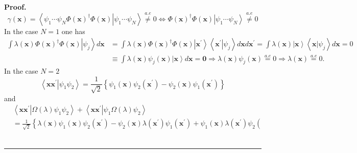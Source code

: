 \documentclass[aps,preprint]{revtex4}%
\newenvironment{proof}[1][Proof]{\noindent\textbf{#1.} }{\ \rule{0.5em}{0.5em}}
\begin{document}
\begin{proof}
\begin{equation}
\gamma\left(  \mathbf{x}\right)  =\left\langle \psi_{1}\cdots\psi_{N}\left.
\Phi\left(  \mathbf{x}\right)  ^{\dagger}\Phi\left(  \mathbf{x}\right)
\right\vert \psi_{1}\cdots\psi_{N}\right\rangle \overset{a.e}{\neq
}0\Longleftrightarrow\Phi\left(  \mathbf{x}\right)  ^{\dagger}\Phi\left(
\mathbf{x}\right)  \left\vert \psi_{1}\cdots\psi_{N}\right\rangle
\overset{a.e}{\neq}0
\end{equation}
In the case $N=1$ one has%
\begin{align}
\int\lambda\left(  \mathbf{x}\right)  \Phi\left(  \mathbf{x}\right)
^{\dagger}\Phi\left(  \mathbf{x}\right)  \left\vert \psi_{j}\right\rangle
d\mathbf{x}  &  =\int\lambda\left(  \mathbf{x}\right)  \Phi\left(
\mathbf{x}\right)  ^{\dagger}\Phi\left(  \mathbf{x}\right)  \left\vert
\mathbf{x}^{\prime}\right\rangle \left\langle \left.  \mathbf{x}^{\prime
}\right\vert \psi_{j}\right\rangle d\mathbf{x}d\mathbf{x}^{\prime}=\int
\lambda\left(  \mathbf{x}\right)  \left\vert \mathbf{x}\right\rangle
\left\langle \left.  \mathbf{x}\right\vert \psi_{j}\right\rangle
d\mathbf{x}=0\nonumber\\
&  \equiv\int\lambda\left(  \mathbf{x}\right)  \psi_{j}\left(  \mathbf{x}%
\right)  \left\vert \mathbf{x}\right\rangle d\mathbf{x=0\Rightarrow}%
\lambda\left(  \mathbf{x}\right)  \psi_{j}\left(  \mathbf{x}\right)
\overset{a.e}{=}0\Rightarrow\lambda\left(  \mathbf{x}\right)  \overset{a.e}%
{=}0.
\end{align}
In the case $N=2$
\begin{equation}
\left\langle \left.  \mathbf{xx}^{\prime}\right\vert \psi_{1}\psi
_{2}\right\rangle =\frac{1}{\sqrt{2}}\left\{  \psi_{1}\left(  \mathbf{x}%
\right)  \psi_{2}\left(  \mathbf{x}^{\prime}\right)  -\psi_{2}\left(
\mathbf{x}\right)  \psi_{1}\left(  \mathbf{x}^{\prime}\right)  \right\}
\end{equation}
and%
\begin{align}
&  \left\langle \left.  \mathbf{xx}^{\prime}\right\vert \Omega\left(
\lambda\right)  \psi_{1}\psi_{2}\right\rangle +\left\langle \left.
\mathbf{xx}^{\prime}\right\vert \psi_{1}\Omega\left(  \lambda\right)  \psi
_{2}\right\rangle \nonumber\\
&  =\frac{1}{\sqrt{2}}\left\{  \lambda\left(  \mathbf{x}\right)  \psi
_{1}\left(  \mathbf{x}\right)  \psi_{2}\left(  \mathbf{x}^{\prime}\right)
-\psi_{2}\left(  \mathbf{x}\right)  \lambda\left(  \mathbf{x}^{\prime}\right)
\psi_{1}\left(  \mathbf{x}^{\prime}\right)  +\psi_{1}\left(  \mathbf{x}%
\right)  \lambda\left(  \mathbf{x}^{\prime}\right)  \psi_{2}\left(

\end{align}
\end{proof}
\end{document}
